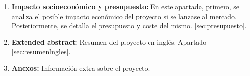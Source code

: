\begin{enumerate}
\item \textbf{Impacto socioeconómico y presupuesto:} En este apartado, primero, se analiza el posible impacto económico del proyecto si se lanzase al mercado. Posteriormente, se detalla el presupuesto y coste del mismo. \ref{sec:presupuesto}.

\item \textbf{Extended abstract:} Resumen del proyecto en inglés. Apartado \ref{sec:resumenIngles}.

\item \textbf{Anexos:} Información extra sobre el proyecto.

\end{enumerate}